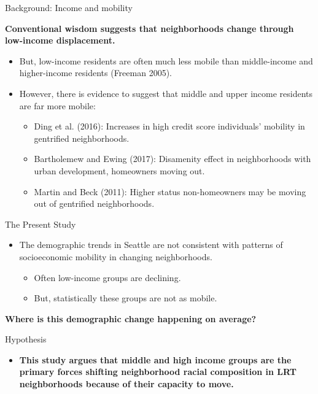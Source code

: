 \documentclass[11pt,ignorenonframetext,]{beamer}
\providecommand{\tightlist}{%
  \setlength{\itemsep}{0pt}\setlength{\parskip}{0pt}}
\begin{document}
\begin{frame}{Background: Income and mobility}
\protect\hypertarget{background-income-and-mobility}{}

\textbf{Conventional wisdom suggests that neighborhoods change through
low-income displacement.}

\begin{itemize}
\tightlist
\item
  But, low-income residents are often much less mobile than
  middle-income and higher-income residents (Freeman 2005).
\item
  However, there is evidence to suggest that middle and upper income
  residents are far more mobile:

  \begin{itemize}
  \tightlist
  \item
    Ding et al. (2016): Increases in high credit score individuals'
    mobility in gentrified neighborhoods.
  \item
    Bartholemew and Ewing (2017): Disamenity effect in neighborhoods
    with urban development, homeowners moving out.
  \item
    Martin and Beck (2011): Higher status non-homeowners may be moving
    out of gentrified neighborhoods.
  \end{itemize}
\end{itemize}

\end{frame}

\begin{frame}{The Present Study}
\protect\hypertarget{the-present-study-1}{}

\begin{itemize}
\tightlist
\item
  The demographic trends in Seattle are not consistent with patterns of
  socioeconomic mobility in changing neighborhoods.

  \begin{itemize}
  \tightlist
  \item
    Often low-income groups are declining.
  \item
    But, statistically these groups are not as mobile.
  \end{itemize}
\end{itemize}

\textbf{Where is this demographic change happening on average?}

\end{frame}

\begin{frame}{Hypothesis}
\protect\hypertarget{hypothesis}{}

\begin{itemize}
\tightlist
\item
  \textbf{This study argues that middle and high income groups are the
  primary forces shifting neighborhood racial composition in LRT
  neighborhoods because of their capacity to move.}
\end{itemize}

\end{frame}
\end{document}
